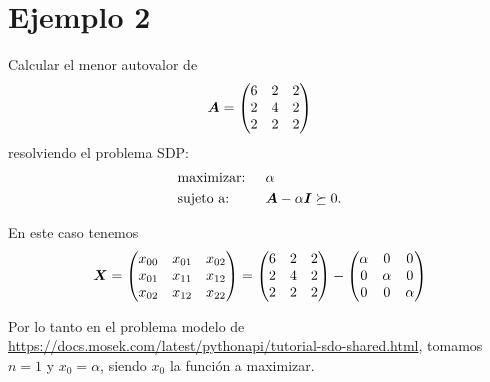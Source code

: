\documentclass[11pt]{article}
\begin{document}
    





\section{Ejemplo 2}

Calcular el menor autovalor de 
$$\bm{A} = 
\begin{pmatrix}
6 & 2 & 2 \\
2 & 4 & 2 \\
2 & 2 & 2 
\end{pmatrix}
$$
resolviendo el problema SDP:
\begin{alignat*}{2}
  & \text{maximizar: } & & \alpha \\
  & \text{sujeto a: } & & \bm{A} - \alpha \bm{I}  \succeq 0.
\end{alignat*}


En este caso tenemos
$$
\bm{X} = 
\begin{pmatrix}
x_{00} & x_{01} & x_{02} \\
x_{01} & x_{11} & x_{12} \\
x_{02} & x_{12} & x_{22}
\end{pmatrix} = \begin{pmatrix}
6 & 2 & 2 \\
2 & 4 & 2 \\
2 & 2 & 2
\end{pmatrix}
- \begin{pmatrix}
\alpha & 0 & 0 \\
0 & \alpha & 0 \\
0 & 0 & \alpha
\end{pmatrix}
$$

Por lo tanto en el problema modelo de \url{https://docs.mosek.com/latest/pythonapi/tutorial-sdo-shared.html}, tomamos $n=1$ y $x_0 = \alpha$, siendo $x_0$ la función a maximizar.
\end{document}
